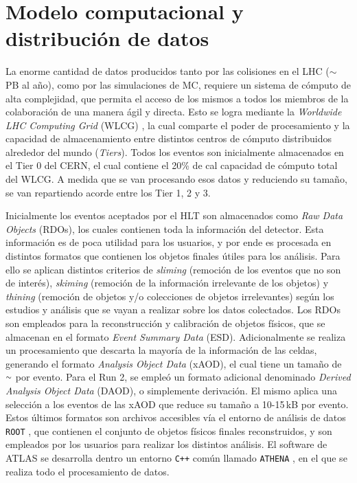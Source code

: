 
\section{Modelo computacional y distribución de datos}\label{sec:lhc_samples}


La enorme cantidad de datos producidos tanto por las colisiones en el LHC ($\sim$\,PB al año), como por las simulaciones de MC, requiere un sistema de cómputo de alta complejidad, que permita el acceso de los mismos a todos los miembros de la colaboración de una manera ágil y directa. Esto se logra mediante la \textit{Worldwide LHC Computing Grid} (WLCG) \cite{grid}, la cual comparte el poder de procesamiento y la capacidad de almacenamiento entre distintos centros de cómputo distribuidos alrededor del mundo (\textit{Tiers}). Todos los eventos son inicialmente almacenados en el Tier 0 del CERN, el cual contiene el 20\% de cal capacidad de cómputo total del WLCG. A medida que se van procesando esos datos y reduciendo su tamaño, se van repartiendo acorde entre los Tier 1, 2 y 3.

Inicialmente los eventos aceptados por el HLT son almacenados como \textit{Raw Data Objects} (RDOs), los cuales contienen toda la información del detector. Esta información es de poca utilidad para los usuarios, y por ende es procesada en distintos formatos que contienen los objetos finales útiles para los análisis. Para ello se aplican distintos criterios de \textit{sliming} (remoción de los eventos que no son de interés), \textit{skiming} (remoción de la información irrelevante de los objetos) y \textit{thining} (remoción de objetos y/o colecciones de objetos irrelevantes) según los estudios y análisis que se vayan a realizar sobre los datos colectados. Los RDOs son empleados para la reconstrucción y calibración de objetos físicos, que se almacenan en el formato \textit{Event Summary Data} (ESD). Adicionalmente se realiza un procesamiento que descarta la mayoría de la información de las celdas, generando el formato \textit{Analysis Object Data} (xAOD), el cual tiene un tamaño de {$\smallsim$} por evento. Para el Run 2, se empleó un formato adicional denominado \textit{Derived Analysis Object Data} (DAOD), o simplemente derivación. El mismo aplica una selección a los eventos de las xAOD que reduce su tamaño a 10-15\,kB por evento. Estos últimos formatos son archivos accesibles vía el entorno de análisis de datos \texttt{ROOT} \cite{Brun:1997}, que contienen el conjunto de objetos físicos finales reconstruidos, y son empleados por los usuarios para realizar los distintos análisis.
El software de ATLAS se desarrolla dentro un entorno \texttt{C++} común llamado \texttt{ATHENA} \cite{ATLAS-TDR-17, analysistools, Calafiura:865624}, en el que se realiza todo el procesamiento de datos. 

